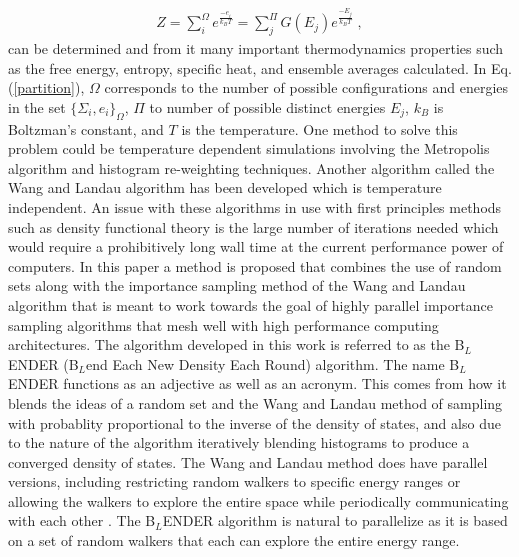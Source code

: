 \documentclass[aps,prl,reprint,superscriptaddress,showkeys]{revtex4-1}
\begin{document}
\begin{equation}
\begin{split}
Z = \sum_{i}^{\Omega}e^{\frac{-e_i}{k_B T} }= \sum_{j}^{\Pi}G(E_j)e^{\frac{-E_j}{k_BT}} \;,
\end{split}
\label{partition}
\end{equation}
can be  determined and from it many important thermodynamics properties such as the free energy, entropy, specific heat, and ensemble averages calculated. In Eq. (\ref{partition}), $\Omega$ corresponds to the number of possible configurations and energies in the set $\{\Sigma_i,e_i\}_\Omega$, $\Pi$ to number of possible distinct energies $E_j$, $k_B$ is Boltzman's constant, and $T$ is the temperature. One method to solve this problem could be temperature dependent simulations involving the  Metropolis algorithm and histogram re-weighting techniques\cite{metropolis_equation_1953, landau_MC_simulations}.   Another algorithm called the  Wang and Landau algorithm\cite{WL_phys_rev_lett} has been developed which is temperature independent.  An issue with these algorithms in use with first principles methods such as density functional theory is the large number of iterations needed which would require a prohibitively long wall time at the current performance power of computers.  In this paper a method is proposed that combines the use of random sets along with the importance sampling method of the Wang and Landau algorithm that is meant to work towards the goal of highly parallel importance sampling algorithms that mesh well with high performance computing architectures. The algorithm developed in this work is referred to as the B$_{L}$ENDER (B$_{L}$end Each New Density Each Round) algorithm. The name B$_{L}$ENDER functions as an  adjective as well as an acronym. This comes from how it blends the ideas of a random set and the Wang and Landau method of sampling with probablity proportional to the inverse of the density of states, and also due to the nature of the algorithm iteratively blending histograms to produce a converged density of states.  The Wang and Landau method does have parallel versions, including  restricting random walkers to specific energy ranges or allowing the walkers to explore the entire space while periodically communicating with each other \cite{MP_Wang_Landau,P_imp_Wang_Landau, Hframe_Wang_Landau}.  The B$_{L}$ENDER algorithm is natural to parallelize as it is based on a set of random walkers that each can explore the entire energy range. 
\end{document}
